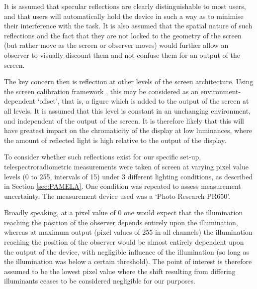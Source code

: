 It is assumed that specular reflections are clearly distinguishable to most users, and that users will automatically hold the device in such a way as to minimise their interference with the task. It is also assumed that the spatial nature of such reflections and the fact that they are not locked to the geometry of the screen (but rather move as the screen or observer moves) would further allow an observer to visually discount them and not confuse them for an output of the screen.

The key concern then is reflection at other levels of the screen architecture. Using the screen calibration framework \cite{berns_crt_1993}, this may be considered as an environment-dependent `offset', that is, a figure which is added to the output of the screen at all levels. It is assumed that this level is constant in an unchanging environment, and independent of the output of the screen. It is therefore likely that this will have greatest impact on the chromaticity of the display at low luminances, where the amount of reflected light is high relative to the output of the display.

To consider whether such reflections exist for our specific set-up, telespectroradiometric measurements were taken of screen at varying pixel value levels (0 to 255, intervals of 15) under 3 different lighting conditions, as described in Section \ref{sec:PAMELA}. One condition was repeated to assess measurement uncertainty. The measurement device used was a `Photo Research PR650'. 

Broadly speaking, at a pixel value of 0 one would expect that the illumination reaching the position of the observer depends entirely upon the illumination, whereas at maximum output (pixel values of 255 in all channels) the illumination reaching the position of the observer would be almost entirely dependent upon the output of the device, with negligible influence of the illumination (so long as the illumination was below a certain threshold). The point of interest is therefore assumed to be the lowest pixel value where the shift resulting from differing illuminants ceases to be considered negligible for our purposes.



